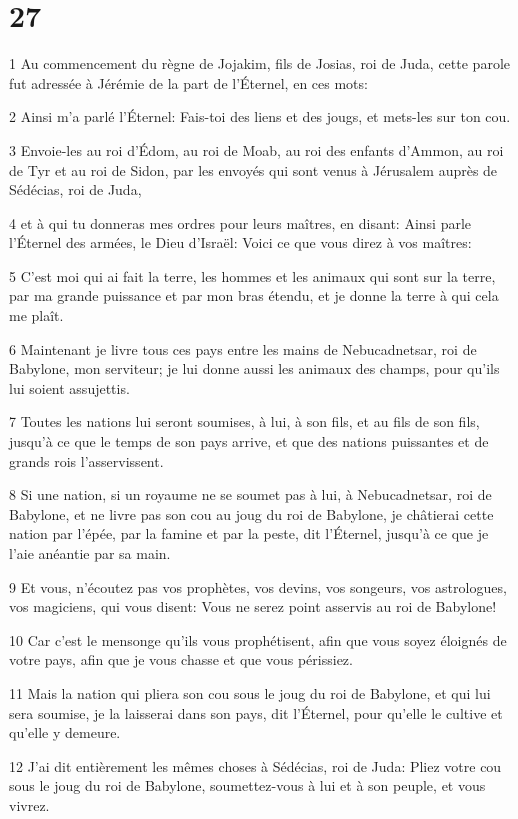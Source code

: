 \chapter{27}

\par 1 Au commencement du règne de Jojakim, fils de Josias, roi de Juda, cette parole fut adressée à Jérémie de la part de l'Éternel, en ces mots:
\par 2 Ainsi m'a parlé l'Éternel: Fais-toi des liens et des jougs, et mets-les sur ton cou.
\par 3 Envoie-les au roi d'Édom, au roi de Moab, au roi des enfants d'Ammon, au roi de Tyr et au roi de Sidon, par les envoyés qui sont venus à Jérusalem auprès de Sédécias, roi de Juda,
\par 4 et à qui tu donneras mes ordres pour leurs maîtres, en disant: Ainsi parle l'Éternel des armées, le Dieu d'Israël: Voici ce que vous direz à vos maîtres:
\par 5 C'est moi qui ai fait la terre, les hommes et les animaux qui sont sur la terre, par ma grande puissance et par mon bras étendu, et je donne la terre à qui cela me plaît.
\par 6 Maintenant je livre tous ces pays entre les mains de Nebucadnetsar, roi de Babylone, mon serviteur; je lui donne aussi les animaux des champs, pour qu'ils lui soient assujettis.
\par 7 Toutes les nations lui seront soumises, à lui, à son fils, et au fils de son fils, jusqu'à ce que le temps de son pays arrive, et que des nations puissantes et de grands rois l'asservissent.
\par 8 Si une nation, si un royaume ne se soumet pas à lui, à Nebucadnetsar, roi de Babylone, et ne livre pas son cou au joug du roi de Babylone, je châtierai cette nation par l'épée, par la famine et par la peste, dit l'Éternel, jusqu'à ce que je l'aie anéantie par sa main.
\par 9 Et vous, n'écoutez pas vos prophètes, vos devins, vos songeurs, vos astrologues, vos magiciens, qui vous disent: Vous ne serez point asservis au roi de Babylone!
\par 10 Car c'est le mensonge qu'ils vous prophétisent, afin que vous soyez éloignés de votre pays, afin que je vous chasse et que vous périssiez.
\par 11 Mais la nation qui pliera son cou sous le joug du roi de Babylone, et qui lui sera soumise, je la laisserai dans son pays, dit l'Éternel, pour qu'elle le cultive et qu'elle y demeure.
\par 12 J'ai dit entièrement les mêmes choses à Sédécias, roi de Juda: Pliez votre cou sous le joug du roi de Babylone, soumettez-vous à lui et à son peuple, et vous vivrez.
